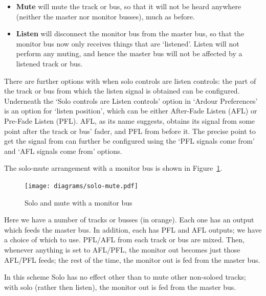 \documentclass[10pt,a4paper]{book}
\begin{document}
{\begin{itemize}
\item \textbf{Mute} will mute the track or bus, so that it will not be
  heard anywhere (neither the master nor monitor busses), much as before.
\item \textbf{Listen} will disconnect the monitor bus from the master
  bus, so that the monitor bus now only receives things that are
  `listened'.  Listen will not perform any muting, and hence the
  master bus will not be affected by a listened track or bus.
\end{itemize}

There are further options with when solo controls are listen controls:
the part of the track or bus from which the listen signal is obtained
can be configured.  Underneath the `Solo controls are Listen controls'
option in `Ardour Preferences' is an option for `listen position',
which can be either After-Fade Listen (AFL) or Pre-Fade Listen (PFL).
AFL, as its name suggests, obtains its signal from some point after
the track or bus' fader, and PFL from before it.  The precise point to
get the signal from can further be configured using the `PFL signals
come from' and `AFL signals come from' options.

The solo-mute arrangement with a monitor bus is shown in Figure~\ref{fig:solo-mute}.

\begin{figure}[ht]
\begin{center}
\texttt{[image: diagrams/solo-mute.pdf]}
\end{center}
\caption{Solo and mute with a monitor bus}
\label{fig:solo-mute}
\end{figure}

Here we have a number of tracks or busses (in orange).  Each one has
an output which feeds the master bus.  In addition, each has PFL and
AFL outputs; we have a choice of which to use.  PFL/AFL from each
track or bus are mixed.  Then, whenever anything is set to AFL/PFL,
the monitor out becomes just those AFL/PFL feeds; the rest of the
time, the monitor out is fed from the master bus.

In this scheme Solo has no effect other than to mute other non-soloed
tracks; with solo (rather then listen), the monitor out is fed from
the master bus.




}
\end{document}
